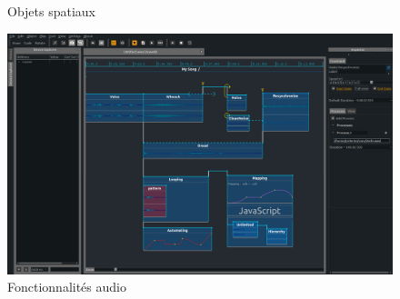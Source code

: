\documentclass{beamer}
\begin{document}
\begin{frame}
\begin{figure}
\begin{columns}
\begin{column}{0.5\textwidth}
\begin{figure}
		\vspace{3.5mm}
	\end{figure}		
\end{column}
\end{columns}
\caption{Objets spatiaux}
\end{figure}
\end{frame}

\begin{frame}
	\begin{figure}
		\includegraphics[width=\textwidth]{images/audio.png}
		\caption{Fonctionnalités audio}
	\end{figure}
\end{frame}
\end{document}
